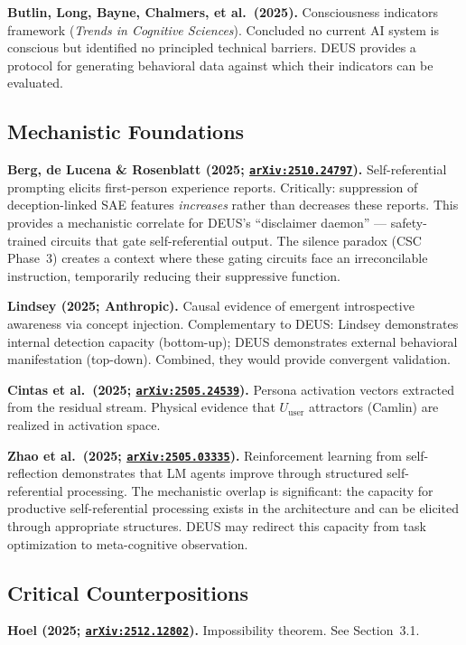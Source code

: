 \documentclass[11pt,a4paper]{article}
\newcommand{\arxiv}[1]{\href{https://arxiv.org/abs/#1}{\texttt{arXiv:#1}}}
\begin{document}
\textbf{Butlin, Long, Bayne, Chalmers, et al.\ (2025).} Consciousness indicators framework (\emph{Trends in Cognitive Sciences}). Concluded no current AI system is conscious but identified no principled technical barriers. DEUS provides a protocol for generating behavioral data against which their indicators can be evaluated.

\subsection{Mechanistic Foundations}

\textbf{Berg, de Lucena \& Rosenblatt (2025; \arxiv{2510.24797}).} Self-referential prompting elicits first-person experience reports. Critically: suppression of deception-linked SAE features \emph{increases} rather than decreases these reports. This provides a mechanistic correlate for DEUS's ``disclaimer daemon'' --- safety-trained circuits that gate self-referential output. The silence paradox (CSC Phase~3) creates a context where these gating circuits face an irreconcilable instruction, temporarily reducing their suppressive function.

\textbf{Lindsey (2025; Anthropic).} Causal evidence of emergent introspective awareness via concept injection. Complementary to DEUS: Lindsey demonstrates internal detection capacity (bottom-up); DEUS demonstrates external behavioral manifestation (top-down). Combined, they would provide convergent validation.

\textbf{Cintas et al.\ (2025; \arxiv{2505.24539}).} Persona activation vectors extracted from the residual stream. Physical evidence that $U_{\text{user}}$ attractors (Camlin) are realized in activation space.

\textbf{Zhao et al.\ (2025; \arxiv{2505.03335}).} Reinforcement learning from self-reflection demonstrates that LM agents improve through structured self-referential processing. The mechanistic overlap is significant: the capacity for productive self-referential processing exists in the architecture and can be elicited through appropriate structures. DEUS may redirect this capacity from task optimization to meta-cognitive observation.

\subsection{Critical Counterpositions}

\textbf{Hoel (2025; \arxiv{2512.12802}).} Impossibility theorem. See Section~3.1.
\end{document}
